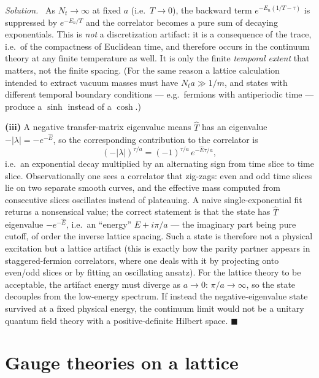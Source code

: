\documentclass[11pt]{article}
\newenvironment{solution}{\par\smallskip\noindent\textit{Solution.}\ }{\hfill$\blacksquare$\par\smallskip}
\begin{document}
\begin{solution}
As $N_t \to \infty$ at fixed $a$ (i.e.\ $T\to0$), the backward term $e^{-E_n(1/T - \tau)}$ is suppressed by $e^{-E_n/T}$ and the correlator becomes a pure sum of decaying exponentials. This is \emph{not} a discretization artifact: it is a consequence of the trace, i.e.\ of the compactness of Euclidean time, and therefore occurs in the continuum theory at any finite temperature as well. It is only the finite \emph{temporal extent} that matters, not the finite spacing. (For the same reason a lattice calculation intended to extract vacuum masses must have $N_t a \gg 1/m$, and states with different temporal boundary conditions --- e.g.\ fermions with antiperiodic time --- produce a $\sinh$ instead of a $\cosh$.)

\textbf{(iii)} A negative transfer-matrix eigenvalue means $\hat T$ has an eigenvalue $-|\lambda| = -e^{-\hat E}$, so the corresponding contribution to the correlator is
\begin{equation}
(-|\lambda|)^{\tau/a} = (-1)^{\tau/a}\, e^{-\hat E \tau /a},
\end{equation}
i.e.\ an exponential decay multiplied by an alternating sign from time slice to time slice. Observationally one sees a correlator that zig-zags: even and odd time slices lie on two separate smooth curves, and the effective mass computed from consecutive slices oscillates instead of plateauing. A naive single-exponential fit returns a nonsensical value; the correct statement is that the state has $\hat T$ eigenvalue $-e^{-\hat E}$, i.e.\ an ``energy'' $E + i\pi/a$ --- the imaginary part being pure cutoff, of order the inverse lattice spacing. Such a state is therefore not a physical excitation but a lattice artifact (this is exactly how the parity partner appears in staggered-fermion correlators, where one deals with it by projecting onto even/odd slices or by fitting an oscillating ansatz). For the lattice theory to be acceptable, the artifact energy must diverge as $a\to 0$: $\pi/a \to \infty$, so the state decouples from the low-energy spectrum. If instead the negative-eigenvalue state survived at a fixed physical energy, the continuum limit would not be a unitary quantum field theory with a positive-definite Hilbert space.
\end{solution}

\section{Gauge theories on a lattice}
\end{document}
